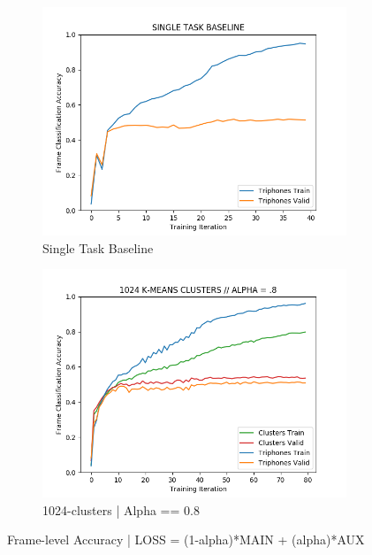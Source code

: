 \documentclass[final]{beamer} %
\begin{document}
\begin{frame}
\begin{columns}
\begin{column}{0.22\textwidth}
{        \begin{figure}
          \centering
          \begin{subfigure}{.5\textwidth}
            \centering
            \includegraphics[width=.95\linewidth]{figs/baseline.png}
            \caption{Single Task Baseline}
            \label{fig:sub1}
          \end{subfigure}%
          \begin{subfigure}{.5\textwidth}
            \centering
            \includegraphics[width=.95\linewidth]{figs/1024-clusters.png}
            \caption{1024-clusters | Alpha == 0.8}
            \label{fig:sub2}
          \end{subfigure}
          \caption{Frame-level Accuracy | LOSS = (1-alpha)*MAIN + (alpha)*AUX }
          \label{fig:test}
        \end{figure}

}
\end{column}
\end{columns}
\end{frame}
\end{document}
